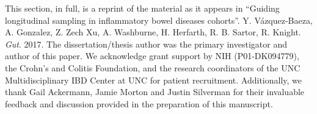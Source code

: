 This section, in full, is a reprint of the material as it appears in ``Guiding 
longitudinal sampling in inflammatory bowel diseases cohorts''. Y.  
V\'azquez-Baeza, A. Gonzalez, Z. Zech Xu, A. Washburne, H.  Herfarth, R.  B.  
Sartor, R. Knight. \emph{Gut}. 2017. The dissertation/thesis author was the 
primary investigator and author of this paper. We acknowledge grant support by 
NIH (P01-DK094779), the Crohn's and Colitis Foundation, and the research 
coordinators of the UNC Multidisciplinary IBD Center at UNC for patient 
recruitment. Additionally, we thank Gail Ackermann, Jamie Morton and Justin 
Silverman for their invaluable feedback and discussion provided in the 
preparation of this manuscript.
